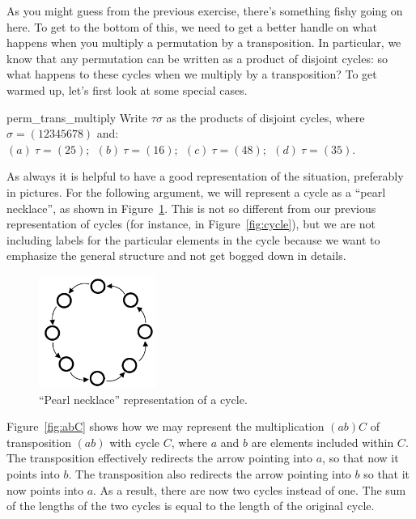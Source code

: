 As you might guess from the previous exercise, there's something fishy going on here. 
To get to the bottom of this, we need to  get a better handle on what happens when you multiply a permutation by a transposition. 
In particular, we know that any permutation can be written as a product of  disjoint cycles: so what happens to these cycles when we multiply by a transposition? To get warmed up, let's first look at some special cases.

\begin{exercise}{perm_trans_multiply}
Write $\tau \sigma$  as the products of disjoint cycles, where $\sigma = (12345678)$ and:
$(a)~\tau= (25);~~ (b)~\tau= (16);~~ (c)~\tau=(48) ;~~ (d)~\tau=(35)$.
\end{exercise}


As always it is helpful to have a good representation of the situation, preferably in pictures. For the following argument, we will represent a cycle as a ``pearl necklace'', as shown in Figure~\ref{fig:pearl}. This is not so different from our previous representation of cycles (for instance, in Figure~\ref{fig:cycle}), but we are not including labels for the particular elements in the cycle because we want to emphasize the general structure and not get bogged down in details. 

\begin{figure}[ht]
\begin{center}
\includegraphics[width=1.5in]{images/pearl_necklace.png}
\caption{``Pearl necklace'' representation of a cycle.}\label{fig:pearl}
\end{center}
\end{figure}


Figure~\ref{fig:abC} shows how we may represent the multiplication $(ab)C$ of transposition $(ab)$ with cycle $C$, where $a$ and $b$ are elements included within $C$. The transposition effectively redirects the arrow pointing into $a$, so that now it points into $b$. The transposition also redirects the arrow pointing into $b$ so that it now points into $a$. As a result, there are now two cycles instead of one. The sum of the lengths of the two cycles is equal to the length of the original cycle.

